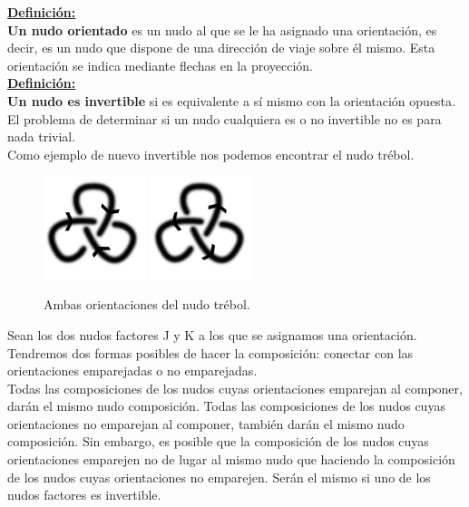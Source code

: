 \documentclass[14pt]{extarticle}
\begin{document}
   \underline{\textbf{ Definición:}}\\
   \textbf{ Un nudo orientado} es un nudo al que se le ha asignado una orientación, es decir, es un nudo que dispone de una dirección de viaje sobre él mismo. Esta orientación se indica mediante flechas en la proyección. \\
   
   \underline{\textbf{ Definición:}}\\
   \textbf{ Un nudo es invertible} si es equivalente a sí mismo con la orientación opuesta. \\
   
      El problema de determinar si un nudo cualquiera es o no invertible no es para nada trivial.\\
   
   Como ejemplo de nuevo invertible nos podemos encontrar el nudo trébol.
      \begin{figure}[h!]
      	\includegraphics[width=3cm]{inudos/3fcon1.png}
      	\includegraphics[width=3cm]{inudos/3fcon2.png}
      	\centering
      	\caption{Ambas orientaciones del nudo trébol.}
      	\label{comp5} 
      \end{figure}
   
   Sean los dos nudos factores J y K a los que se asignamos una orientación. Tendremos dos formas posibles de hacer la composición: conectar con las orientaciones emparejadas o no emparejadas. \\
   Todas las composiciones de los nudos cuyas orientaciones emparejan al componer, darán el mismo nudo composición. Todas las composiciones de los nudos cuyas orientaciones no emparejan al componer, también darán el mismo nudo composición. Sin embargo, es posible que la composición de los nudos cuyas orientaciones emparejen no de lugar al mismo nudo que haciendo la composición de los nudos cuyas orientaciones no emparejen. Serán el mismo si uno de los nudos factores es invertible.\\
   
\end{document}
